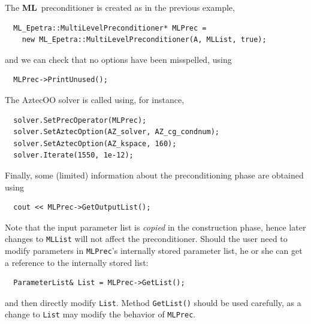 \documentclass{article}[11pt]
\newcommand{\ML}     {{\bf ML}}
\begin{document}
The \ML\ preconditioner is created as in the previous example,
\begin{verbatim}
  ML_Epetra::MultiLevelPreconditioner* MLPrec =
    new ML_Epetra::MultiLevelPreconditioner(A, MLList, true);
\end{verbatim}
and we can check that no options have been misspelled, using
\begin{verbatim}
  MLPrec->PrintUnused();
\end{verbatim}
The AztecOO solver is called using, for instance,
\begin{verbatim}
  solver.SetPrecOperator(MLPrec);
  solver.SetAztecOption(AZ_solver, AZ_cg_condnum);
  solver.SetAztecOption(AZ_kspace, 160);
  solver.Iterate(1550, 1e-12);
\end{verbatim}
Finally, some (limited) information about the preconditioning phase are
obtained using
\begin{verbatim}
  cout << MLPrec->GetOutputList();
\end{verbatim}

Note that the input parameter list is {\sl copied} in the
construction phase, hence later changes to \verb!MLList! will not affect
the preconditioner. Should the user need to modify parameters in 
\verb!MLPrec!'s internally stored parameter list, he or she can get a
reference to the internally stored list:
%
\begin{verbatim}
  ParameterList& List = MLPrec->GetList();
\end{verbatim}
%
and then directly modify \verb!List!. Method \verb!GetList()! should be used
carefully, as a change to \verb!List! may modify the behavior of
\verb!MLPrec!.
\end{document}
